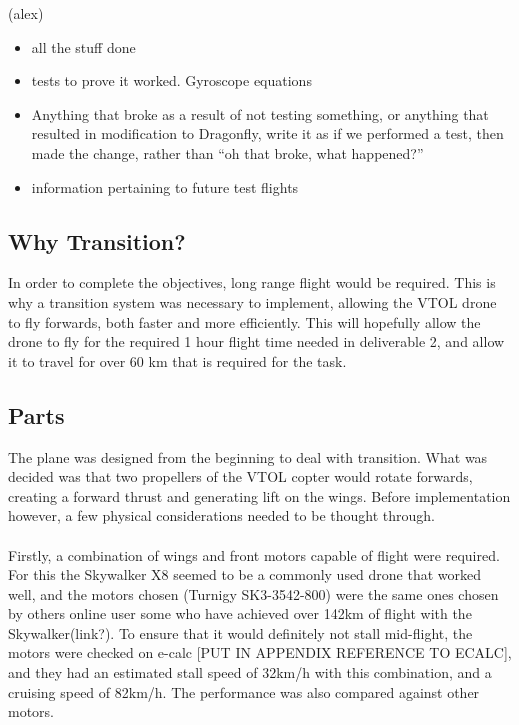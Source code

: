 \color{red}
(alex)
\begin{itemize}
\item all the stuff done
\item tests to prove it worked. Gyroscope equations
\item Anything that broke as a result of not testing something, or anything that resulted in modification to Dragonfly, write it as if we performed a test, then made the change, rather than ``oh that broke, what happened?''
\item information pertaining to future test flights
\end{itemize}
\color{black}
\subsection{Why Transition?}
In order to complete the objectives, long range flight would be required. This is why a transition system was necessary to implement, allowing the VTOL drone to fly forwards, both faster and more efficiently. This will hopefully allow the drone to fly for the required 1 hour flight time needed in deliverable 2, and allow it to travel for over 60 km that is required for the task. 

\subsection{Parts}
The plane was designed from the beginning to deal with transition. What was decided was that two propellers of the VTOL copter would rotate forwards, creating a forward thrust and generating lift on the wings.  Before implementation however, a few physical considerations needed to be thought through.
\\\\
Firstly, a combination of wings and front motors capable of flight were required.  For this the Skywalker X8 seemed to be a commonly used drone that worked well, and the motors chosen (Turnigy SK3-3542-800) were the same ones chosen by others online user some who have achieved over 142km of flight with the Skywalker(link?). To ensure that it would definitely not stall mid-flight, the motors were checked on e-calc \color{red}[PUT IN APPENDIX REFERENCE TO ECALC]\color{black}, and they had an estimated stall speed of 32km/h with this combination, and a cruising speed of 82km/h.  The performance was also compared against other motors. 

